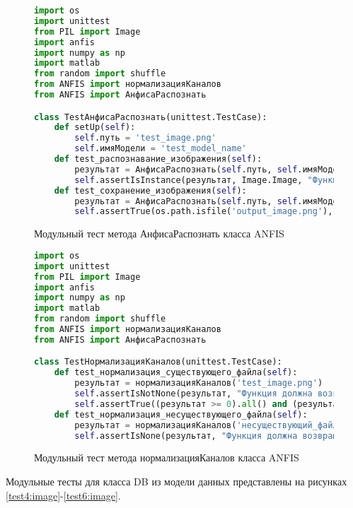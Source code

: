 \begin{figure}[H]
\begin{lstlisting}[language=Python]
import os
import unittest
from PIL import Image
import anfis
import numpy as np
import matlab
from random import shuffle
from ANFIS import нормализацияКаналов
from ANFIS import АнфисаРаспознать

class TestАнфисаРаспознать(unittest.TestCase):
    def setUp(self):
        self.путь = 'test_image.png'
        self.имяМодели = 'test_model_name'
    def test_распознавание_изображения(self):
        результат = АнфисаРаспознать(self.путь, self.имяМодели)
        self.assertIsInstance(результат, Image.Image, "Функция должна возвращать объект изображения")
    def test_сохранение_изображения(self):
        результат = АнфисаРаспознать(self.путь, self.имяМодели)
        self.assertTrue(os.path.isfile('output_image.png'), "Файл изображения должен быть сохранён")
\end{lstlisting}  
\caption{Модульный тест метода АнфисаРаспознать класса ANFIS}
\label{test2:image}
\end{figure}

\begin{figure}[H]
\begin{lstlisting}[language=Python]
import os
import unittest
from PIL import Image
import anfis
import numpy as np
import matlab
from random import shuffle
from ANFIS import нормализацияКаналов
from ANFIS import АнфисаРаспознать

class TestНормализацияКаналов(unittest.TestCase):
    def test_нормализация_существующего_файла(self):
        результат = нормализацияКаналов('test_image.png')
        self.assertIsNotNone(результат, "Функция должна возвращать не None для существующего файла")
        self.assertTrue((результат >= 0).all() and (результат <= 1).all(), "Все значения должны быть в диапазоне от 0 до 1")
    def test_нормализация_несуществующего_файла(self):
        результат = нормализацияКаналов('несуществующий_файл.jpg')
        self.assertIsNone(результат, "Функция должна возвращать None для несуществующего файла")
\end{lstlisting}  
\caption{Модульный тест метода нормализацияКаналов класса ANFIS}
\label{test3:image}
\end{figure}

Модульные тесты для класса DB из модели данных представлены на рисунках \ref{test4:image}-\ref{test6:image}.

